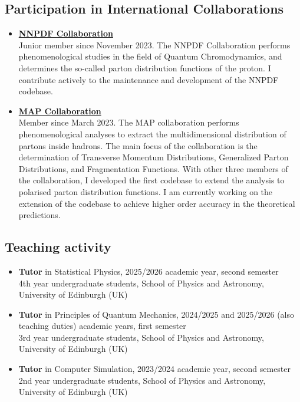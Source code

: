 \documentclass[10pt,a4paper]{article}
\begin{document}
\subsection*{Participation in International Collaborations}
\begin{itemize}[leftmargin=1em]
    \item[]
      \textbf{\href{https://nnpdf.mi.infn.it}{NNPDF Collaboration}} \\
      Junior member since November 2023. The NNPDF Collaboration
      performs phenomenological studies in the field of Quantum Chromodynamics, and determines
      the so-called parton distribution functions of the proton. I contribute actively to the
      maintenance and development of the NNPDF codebase.
    \item[]
      \textbf{\href{https://github.com/MapCollaboration}{MAP Collaboration}} \\
      Member since March 2023. The MAP collaboration performs phenomenological
      analyses to extract the multidimensional distribution of partons inside hadrons. The main
      focus of the collaboration is the determination of Transverse Momentum Distributions, 
      Generalized Parton Distributions, and Fragmentation Functions. With other three members of the
      collaboration, I developed the first codebase to extend the analysis to polarised parton distribution 
      functions. I am currently working on the extension of the codebase to achieve higher order accuracy
      in the theoretical predictions.
\end{itemize}

\subsection*{Teaching activity}
\begin{itemize}[leftmargin=1em]
    \item[]
    \textbf{Tutor} in Statistical Physics, 2025/2026 academic year, second semester \\
    4th year undergraduate students, School of Physics and Astronomy, University of Edinburgh (UK)
    \item[]
    \textbf{Tutor} in Principles of Quantum Mechanics, 2024/2025 and 2025/2026
    (also teaching duties) academic years, first semester \\
    3rd year undergraduate students, School of Physics and Astronomy, University of Edinburgh (UK)
    \item[]
    \textbf{Tutor} in Computer Simulation, 2023/2024 academic year, second semester \\
    2nd year undergraduate students, School of Physics and Astronomy, University of Edinburgh (UK)
\end{itemize}
\end{document}
